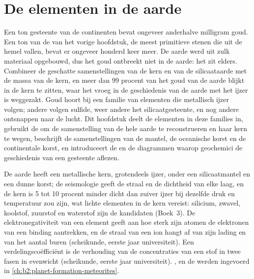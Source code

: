 \chapter{De elementen in de aarde}\label{ch:b2:elements-in-the-earth}

Een ton gesteente van de continenten bevat ongeveer anderhalve milligram
goud. Een ton van de  van het vorige hoofdstuk, de meest
primitieve stenen die uit de hemel vallen, bevat er ongeveer honderd keer meer. De
aarde werd uit zulk materiaal opgebouwd, dus het goud ontbreekt niet in de
aarde: het zit elders. Combineer de geschatte samenstellingen van de kern en van
de silicaataarde met de massa van de kern, en meer dan 99 procent van het
goud van de aarde blijkt in de kern te zitten, waar het vroeg in de geschiedenis van de aarde
met het ijzer is weggezakt. Goud hoort bij een familie van elementen die metallisch
ijzer volgen; andere volgen sulfide, weer andere het silicaatgesteente, en nog andere ontsnappen
naar de lucht. Dit hoofdstuk deelt de elementen in deze families in, gebruikt de
 om de samenstelling van de hele aarde te reconstrueren en haar
kern te wegen, beschrijft de samenstellingen van de mantel, de oceanische korst en de
continentale korst, en introduceert de  en de diagrammen waarop
geochemici de geschiedenis van een gesteente aflezen.

\begin{recall}
De aarde heeft een metallische kern, grotendeels ijzer, onder een silicaatmantel en een dunne
korst; de seismologie geeft de straal en de dichtheid van elke laag, en de kern
is 5 tot 10 procent minder dicht dan zuiver ijzer bij dezelfde druk en
temperatuur zou zijn, wat lichte elementen in de kern vereist: silicium, zwavel, koolstof,
zuurstof en waterstof zijn de kandidaten (Boek~3). De
elektronegativiteit van een element geeft aan hoe sterk zijn atomen de
elektronen van een binding aantrekken, en de straal van een ion hangt af van zijn lading en van het
aantal buren (scheikunde, eerste jaar universiteit). Een
verdelingscoëfficiënt is de verhouding van de concentraties van een stof in twee fasen in
evenwicht (scheikunde, eerste jaar universiteit). ,  en de  werden ingevoerd in
\cref{ch:b2:planet-formation-meteorites}.
\end{recall}

